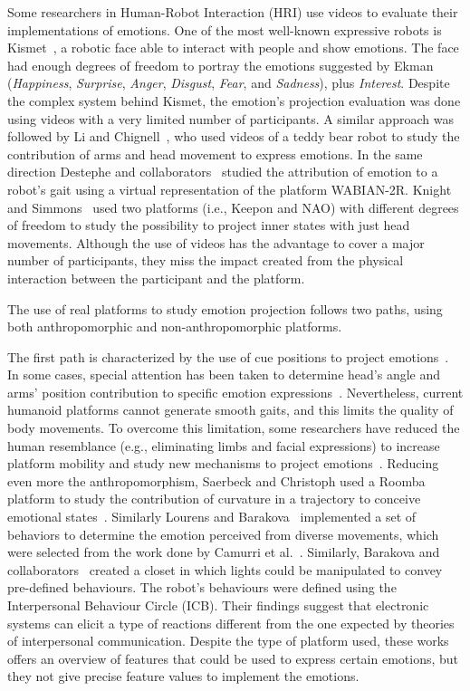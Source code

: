 Some researchers in Human-Robot Interaction (HRI) use videos to evaluate their implementations of emotions. One of the most well-known expressive robots is Kismet~\cite{Breazeal2002}, a robotic face able to interact with people and show emotions. The face had enough degrees of freedom to portray the emotions suggested by Ekman~\cite{Ekman2004} (\textit{Happiness}, \textit{Surprise}, \textit{Anger}, \textit{Disgust}, \textit{Fear}, and \textit{Sadness}), plus \textit{Interest}. 
Despite the complex system behind Kismet, the emotion's projection evaluation was done using videos with a very limited number of participants. A similar approach was followed by Li and Chignell~\cite{Li2011}, who used videos of a teddy bear robot to study the contribution of arms and head movement to express emotions. In the same direction Destephe and collaborators~\cite{Destephe2013} studied the attribution of emotion to a robot's gait using a virtual representation of the platform WABIAN-2R. Knight and Simmons~\cite{knight2016} used two platforms (i.e., Keepon and NAO) with different degrees of freedom to study the possibility to project inner states with just head movements. Although the use of videos has the advantage to cover a major number of participants, they miss the impact created from the physical interaction between the participant and the platform.

The use of real platforms to study emotion projection follows two paths, using both anthropomorphic and non-anthropomorphic platforms. 

The first path is characterized by the use of cue positions to project emotions~\cite{NAO2013}. In some cases, special attention has been taken to determine head's angle and arms' position contribution to specific emotion expressions~\cite{Brown2014}. 
Nevertheless, current humanoid platforms cannot generate smooth gaits, and this limits the quality of body movements. To overcome this limitation, some researchers have reduced the human resemblance (e.g., eliminating limbs and facial expressions) to increase platform mobility and study new mechanisms to project emotions~\cite{Arras2012}. Reducing even more the anthropomorphism, Saerbeck and Christoph used a Roomba platform to study the contribution of curvature in a trajectory to conceive emotional states~\cite{Saerbeck2010}. Similarly Lourens and Barakova~\cite{BarakovaL10} implemented a set of behaviors to determine the emotion  perceived from diverse movements, which were selected from the work done by Camurri et al.~\cite{pop00002}. Similarly, Barakova and collaborators~\cite{Barakova2013} created a closet in which lights could be manipulated to convey pre-defined behaviours. The robot's behaviours were defined using the Interpersonal Behaviour Circle (ICB). Their findings suggest that electronic systems can elicit a type of reactions different from the one expected by theories of interpersonal communication. Despite the type of platform used, these works offers an overview of features that could be used to express certain emotions, but they not give precise feature values to implement the emotions.

